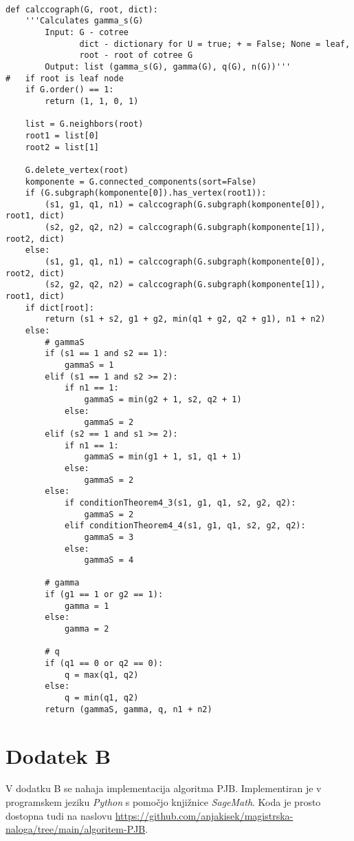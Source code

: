 \documentclass[12pt,a4paper,twoside]{article}
\theoremstyle{definition} %
\theoremstyle{plain} %
\numberwithin{equation}{section}  %
\begin{document}
\begin{verbatim}

def calccograph(G, root, dict):
    '''Calculates gamma_s(G) 
        Input: G - cotree
               dict - dictionary for U = true; + = False; None = leaf,
               root - root of cotree G
        Output: list (gamma_s(G), gamma(G), q(G), n(G))'''
#   if root is leaf node
    if G.order() == 1:
        return (1, 1, 0, 1)
    
    list = G.neighbors(root)
    root1 = list[0]
    root2 = list[1]
    
    G.delete_vertex(root)
    komponente = G.connected_components(sort=False)
    if (G.subgraph(komponente[0]).has_vertex(root1)):
        (s1, g1, q1, n1) = calccograph(G.subgraph(komponente[0]), root1, dict)
        (s2, g2, q2, n2) = calccograph(G.subgraph(komponente[1]), root2, dict)
    else:
        (s1, g1, q1, n1) = calccograph(G.subgraph(komponente[0]), root2, dict)
        (s2, g2, q2, n2) = calccograph(G.subgraph(komponente[1]), root1, dict)
    if dict[root]:
        return (s1 + s2, g1 + g2, min(q1 + g2, q2 + g1), n1 + n2)
    else:
        # gammaS
        if (s1 == 1 and s2 == 1):
            gammaS = 1
        elif (s1 == 1 and s2 >= 2):
            if n1 == 1:
                gammaS = min(g2 + 1, s2, q2 + 1)
            else:
                gammaS = 2
        elif (s2 == 1 and s1 >= 2):
            if n1 == 1:
                gammaS = min(g1 + 1, s1, q1 + 1)
            else:
                gammaS = 2
        else:
            if conditionTheorem4_3(s1, g1, q1, s2, g2, q2):
                gammaS = 2
            elif conditionTheorem4_4(s1, g1, q1, s2, g2, q2):
                gammaS = 3
            else:
                gammaS = 4
        
        # gamma
        if (g1 == 1 or g2 == 1):
            gamma = 1
        else:
            gamma = 2
        
        # q
        if (q1 == 0 or q2 == 0):
            q = max(q1, q2)
        else:
            q = min(q1, q2)
        return (gammaS, gamma, q, n1 + n2)
\end{verbatim}


\section*{Dodatek B}
V dodatku B se nahaja implementacija algoritma PJB. Implementiran je v programskem jeziku \emph{Python} s pomočjo knjižnice \emph{SageMath}. Koda je prosto dostopna tudi na naslovu \url{https://github.com/anjakisek/magistrska-naloga/tree/main/algoritem-PJB}.
\end{document}

